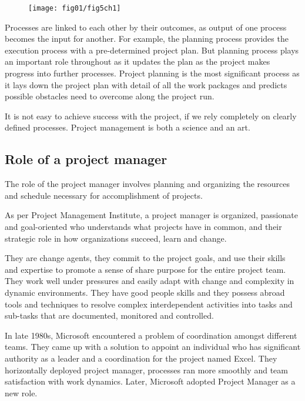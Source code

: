  \begin{figure}
 	\centering
 	\texttt{[image: fig01/fig5ch1]}
 \end{figure}
 Processes are linked to each other by their outcomes, as output of one process becomes the input for another. For example, the planning process provides the execution process with a pre-determined project plan. But planning process plays an important role throughout as it updates the plan as the project makes progress into further processes. Project planning is the most significant process as it lays down the project plan with detail of all the work packages and predicts possible obstacles need to overcome along the project run.

It is not easy to achieve success with the project, if we rely completely on clearly defined processes. Project management is both a science and an art.

\subsection{Role of a project manager}
\label{subsec:subsec02}

The role of the project manager involves planning and organizing the resources and schedule necessary for accomplishment of projects.

As per Project Management Institute, a project manager is organized, passionate and goal-oriented who understands what projects have in common, and their strategic role in how organizations succeed, learn and change.

They are change agents, they commit to the project goals, and use their skills and expertise to promote a sense of share purpose for the entire project team.
They work well under pressures and easily adapt with change and complexity in dynamic environments. They have good people skills and they possess abroad tools and techniques to resolve complex interdependent activities into tasks and sub-tasks that are documented, monitored and controlled.

In late 1980s, Microsoft encountered a problem of coordination amongst different teams. They came up with a solution to appoint an individual who has significant authority as a leader and a coordination for the project named Excel. They horizontally deployed project manager, processes ran more smoothly and team satisfaction with work dynamics. Later, Microsoft adopted Project Manager as a new role.

